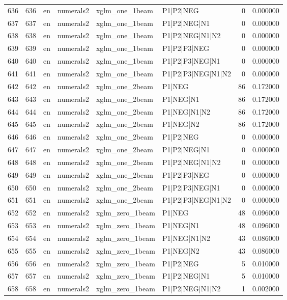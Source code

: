 \begin{tabular}{lrllllrr}
636 & 636 & en & numerals2 & xglm_one_1beam & P1|P2|NEG & 0 & 0.000000 \\
637 & 637 & en & numerals2 & xglm_one_1beam & P1|P2|NEG|N1 & 0 & 0.000000 \\
638 & 638 & en & numerals2 & xglm_one_1beam & P1|P2|NEG|N1|N2 & 0 & 0.000000 \\
639 & 639 & en & numerals2 & xglm_one_1beam & P1|P2|P3|NEG & 0 & 0.000000 \\
640 & 640 & en & numerals2 & xglm_one_1beam & P1|P2|P3|NEG|N1 & 0 & 0.000000 \\
641 & 641 & en & numerals2 & xglm_one_1beam & P1|P2|P3|NEG|N1|N2 & 0 & 0.000000 \\
642 & 642 & en & numerals2 & xglm_one_2beam & P1|NEG & 86 & 0.172000 \\
643 & 643 & en & numerals2 & xglm_one_2beam & P1|NEG|N1 & 86 & 0.172000 \\
644 & 644 & en & numerals2 & xglm_one_2beam & P1|NEG|N1|N2 & 86 & 0.172000 \\
645 & 645 & en & numerals2 & xglm_one_2beam & P1|NEG|N2 & 86 & 0.172000 \\
646 & 646 & en & numerals2 & xglm_one_2beam & P1|P2|NEG & 0 & 0.000000 \\
647 & 647 & en & numerals2 & xglm_one_2beam & P1|P2|NEG|N1 & 0 & 0.000000 \\
648 & 648 & en & numerals2 & xglm_one_2beam & P1|P2|NEG|N1|N2 & 0 & 0.000000 \\
649 & 649 & en & numerals2 & xglm_one_2beam & P1|P2|P3|NEG & 0 & 0.000000 \\
650 & 650 & en & numerals2 & xglm_one_2beam & P1|P2|P3|NEG|N1 & 0 & 0.000000 \\
651 & 651 & en & numerals2 & xglm_one_2beam & P1|P2|P3|NEG|N1|N2 & 0 & 0.000000 \\
652 & 652 & en & numerals2 & xglm_zero_1beam & P1|NEG & 48 & 0.096000 \\
653 & 653 & en & numerals2 & xglm_zero_1beam & P1|NEG|N1 & 48 & 0.096000 \\
654 & 654 & en & numerals2 & xglm_zero_1beam & P1|NEG|N1|N2 & 43 & 0.086000 \\
655 & 655 & en & numerals2 & xglm_zero_1beam & P1|NEG|N2 & 43 & 0.086000 \\
656 & 656 & en & numerals2 & xglm_zero_1beam & P1|P2|NEG & 5 & 0.010000 \\
657 & 657 & en & numerals2 & xglm_zero_1beam & P1|P2|NEG|N1 & 5 & 0.010000 \\
658 & 658 & en & numerals2 & xglm_zero_1beam & P1|P2|NEG|N1|N2 & 1 & 0.002000 \\

\end{tabular}
